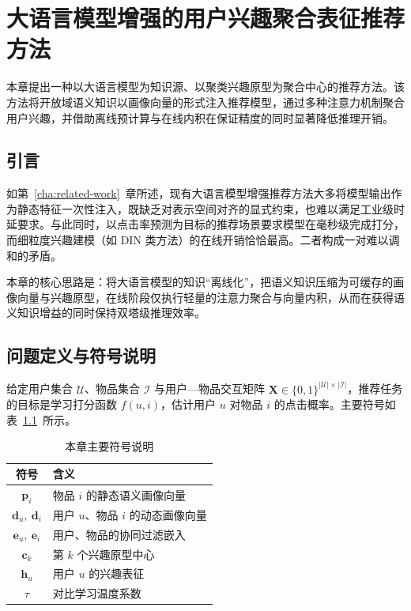 
\chapter{大语言模型增强的用户兴趣聚合表征推荐方法}
\label{cha:llm-interest}

本章提出一种以大语言模型为知识源、以聚类兴趣原型为聚合中心的推荐方法。该方法将开放域语义知识以画像向量的形式注入推荐模型，通过多种注意力机制聚合用户兴趣，并借助离线预计算与在线内积在保证精度的同时显著降低推理开销。


\section{引言}
\label{sec:llm-intro}

如第~\ref{cha:related-work}~章所述，现有大语言模型增强推荐方法大多将模型输出作为静态特征一次性注入，既缺乏对表示空间对齐的显式约束，也难以满足工业级时延要求。与此同时，以点击率预测为目标的推荐场景要求模型在毫秒级完成打分，而细粒度兴趣建模（如 DIN 类方法）的在线开销恰恰最高。二者构成一对难以调和的矛盾。

本章的核心思路是：将大语言模型的知识“离线化”，把语义知识压缩为可缓存的画像向量与兴趣原型，在线阶段仅执行轻量的注意力聚合与向量内积，从而在获得语义知识增益的同时保持双塔级推理效率。

\section{问题定义与符号说明}
\label{sec:llm-problem}

给定用户集合 $\mathcal{U}$、物品集合 $\mathcal{I}$ 与用户—物品交互矩阵 $\mathbf{X}\in\{0,1\}^{|\mathcal{U}|\times|\mathcal{I}|}$，推荐任务的目标是学习打分函数 $f(u,i)$，估计用户 $u$ 对物品 $i$ 的点击概率。主要符号如表~\ref{tab:llm-notation}~所示。


\begin{table}[htbp]
  \centering
  \caption{本章主要符号说明}
  \label{tab:llm-notation}
  \begin{tabular}{cl}
    \toprule
    符号 & 含义 \\
    \midrule
    $\mathbf{p}_i$ & 物品 $i$ 的静态语义画像向量 \\
    $\mathbf{d}_u,\ \mathbf{d}_i$ & 用户 $u$、物品 $i$ 的动态画像向量 \\
    $\mathbf{e}_u,\ \mathbf{e}_i$ & 用户、物品的协同过滤嵌入 \\
    $\mathbf{c}_k$ & 第 $k$ 个兴趣原型中心 \\
    $\mathbf{h}_u$ & 用户 $u$ 的兴趣表征 \\
    $\tau$ & 对比学习温度系数 \\
    \bottomrule
  \end{tabular}
\end{table}

